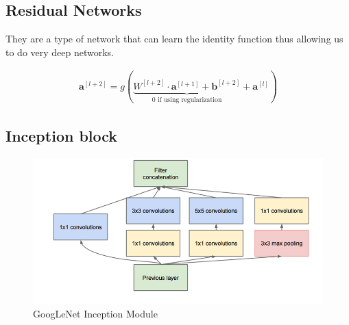 \subsection{Residual Networks}
\begin{frame}{\insertsubsec}
    They are a type of network that can learn the identity function thus allowing us to do
    very deep networks.
    

    \begin{align*}
        \bm{a}^{[l+2]} = 
        g(\underbrace{W^{[l+2]} \cdot \bm{a}^{[l + 1]} + \bm{b}^{[l + 2]}}
        _{0 \text{ if using regularization}} + \bm{a}^{[l]})
    \end{align*}
\end{frame}

\subsection{Inception block}
\begin{frame}{\insertsubsec}
    \begin{figure}[H]
        \includegraphics[width=\textwidth]{images/GoogLeNet3}
        \caption{GoogLeNet Inception Module}
    \end{figure}
\end{frame}


